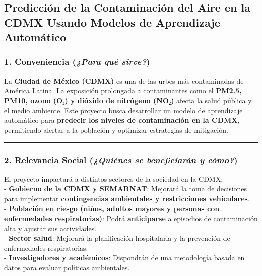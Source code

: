 \documentclass[
  letterpaper,
  DIV=11,
  numbers=noendperiod]{scrartcl}
\begin{document}
\subsection{\texorpdfstring{\textbf{Predicción de la Contaminación del
Aire en la CDMX Usando Modelos de Aprendizaje
Automático}}{Predicción de la Contaminación del Aire en la CDMX Usando Modelos de Aprendizaje Automático}}\label{predicciuxf3n-de-la-contaminaciuxf3n-del-aire-en-la-cdmx-usando-modelos-de-aprendizaje-automuxe1tico}

\subsubsection{\texorpdfstring{\textbf{1. Conveniencia} (\emph{¿Para qué
sirve?})}{1. Conveniencia (¿Para qué sirve?)}}\label{conveniencia-para-quuxe9-sirve}

La \textbf{Ciudad de México (CDMX)} es una de las urbes más contaminadas
de América Latina. La exposición prolongada a contaminantes como el
\textbf{PM2.5, PM10, ozono (O₃) y dióxido de nitrógeno (NO₂)} afecta la
salud pública y el medio ambiente. Este proyecto busca desarrollar un
modelo de aprendizaje automático para \textbf{predecir los niveles de
contaminación en la CDMX}, permitiendo alertar a la población y
optimizar estrategias de mitigación.

\begin{center}\rule{0.5\linewidth}{0.5pt}\end{center}

\subsubsection{\texorpdfstring{\textbf{2. Relevancia Social}
(\emph{¿Quiénes se beneficiarán y
cómo?})}{2. Relevancia Social (¿Quiénes se beneficiarán y cómo?)}}\label{relevancia-social-quiuxe9nes-se-beneficiaruxe1n-y-cuxf3mo}

El proyecto impactará a distintos sectores de la sociedad en la CDMX:\\
- \textbf{Gobierno de la CDMX y SEMARNAT}: Mejorará la toma de
decisiones para implementar \textbf{contingencias ambientales y
restricciones vehiculares}.\\
- \textbf{Población en riesgo (niños, adultos mayores y personas con
enfermedades respiratorias)}: Podrá \textbf{anticiparse} a episodios de
contaminación alta y ajustar sus actividades.\\
- \textbf{Sector salud}: Mejorará la planificación hospitalaria y la
prevención de enfermedades respiratorias.\\
- \textbf{Investigadores y académicos}: Dispondrán de una metodología
basada en datos para evaluar políticas ambientales.
\end{document}
